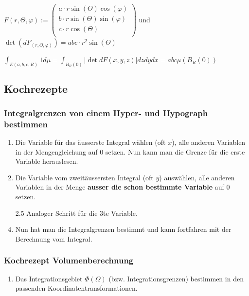 \documentclass[a4paper, fontsize = 8pt, landscape]{scrartcl}
\begin{document}
\begin{multicols*}{3}
    \begin{center}
        $F(r, \Theta, \varphi) := \begin{pmatrix}
                a \cdot r \sin(\Theta) \cos(\varphi) \\ b \cdot r \sin(\Theta) \sin(\varphi) \\ c \cdot r \cos(\Theta) \\
            \end{pmatrix}$ und $\det(dF_{(r, \Theta, \varphi)}) = abc \cdot r^2 \sin(\Theta)$
    \end{center}

    $\int_{E(a, b, c, R)} 1 d \mu=\int_{B_{R}(0)}|\det d F(x, y, z)| d z d y d x = abc \mu\left(B_{R}(0)\right)$




    \subsection{Kochrezepte}


    \subsubsection{Integralgrenzen von einem Hyper- und Hypograph bestimmen}

    \begin{enumerate}
        \item Die Variable für das äusserste Integral wählen (oft $x$), alle anderen Variablen in der Mengengleichung auf $0$ setzen. Nun kann man die Grenze für die erste Variable herauslesen.
        \item Die Variable vom zweitäussersten Integral (oft $y$) auswählen, alle anderen Variablen in der Menge \textbf{ausser die schon bestimmte Variable} auf $0$ setzen.
        \item[2.5] Analoger Schritt für die 3te Variable.
        \item Nun hat man die Integralgrenzen bestimmt und kann fortfahren mit der Berechnung vom Integral.
    \end{enumerate}


    \subsubsection{Kochrezept Volumenberechnung}

    \begin{enumerate}
        \item Das Integrationsgebiet $\Phi(\Omega)$ (bzw. Integrationsgrenzen) bestimmen in den passenden Koordinatentransformationen.


\end{enumerate}
\end{multicols*}
\end{document}
